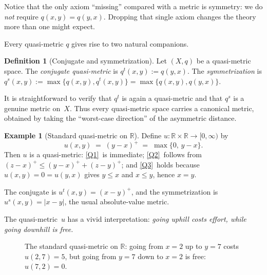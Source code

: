 \documentclass[11pt,a4paper]{article}
\theoremstyle{plain}
\theoremstyle{definition}
\newtheorem{definitioninner}[theoreminner]{Definition}
\newtheorem{exampleinner}[theoreminner]{Example}
\newenvironment{definition}[1][]{\begin{definitioninner}[#1]}{\end{definitioninner}}
\newenvironment{example}[1][]{\begin{exampleinner}[#1]}{\end{exampleinner}}
\newcommand{\R}{\mathbb{R}}
\begin{document}
Notice that the only axiom ``missing'' compared with a metric is
symmetry: we do \emph{not} require $q(x,y)=q(y,x)$.  Dropping that
single axiom changes the theory more than one might expect.

Every quasi-metric $q$ gives rise to two natural companions.

\begin{definition}[Conjugate and symmetrization]\label{def:conjugate}
Let $(X,q)$ be a quasi-metric space.  The \emph{conjugate
quasi-metric} is $q^t(x,y):=q(y,x)$.  The \emph{symmetrization} is
$q^s(x,y):=\max\{q(x,y),q^t(x,y)\}=\max\{q(x,y),q(y,x)\}$.
\end{definition}

It is straightforward to verify that $q^t$ is again a quasi-metric
and that $q^s$ is a genuine metric on~$X$.  Thus every quasi-metric
space carries a canonical metric, obtained by taking the ``worst-case
direction'' of the asymmetric distance.

\begin{example}[Standard quasi-metric on $\R$]\label{ex:standard-qm}
Define $u\colon\R\times\R\to[0,\infty)$ by
\[
  u(x,y) \;=\; (y-x)^+ \;=\; \max\{0,\,y-x\}.
\]
Then $u$ is a quasi-metric:  \ref{Q1}~is immediate; \ref{Q2}~follows
from $(z-x)^+\le(y-x)^++(z-y)^+$; and \ref{Q3}~holds because
$u(x,y)=0=u(y,x)$ gives $y\le x$ and $x\le y$, hence $x=y$.

The conjugate is $u^t(x,y)=(x-y)^+$, and the symmetrization is
$u^s(x,y)=|x-y|$, the usual absolute-value metric.
\end{example}

The quasi-metric~$u$ has a vivid interpretation: \emph{going uphill
costs effort, while going downhill is free.}

\begin{figure}[H]
\centering
{}
\caption{The standard quasi-metric on $\R$: going from $x=2$ up to
$y=7$ costs $u(2,7)=5$, but going from $y=7$ down to $x=2$ is free:
$u(7,2)=0$.}
\label{fig:standard-qm}
\end{figure}
\end{document}
